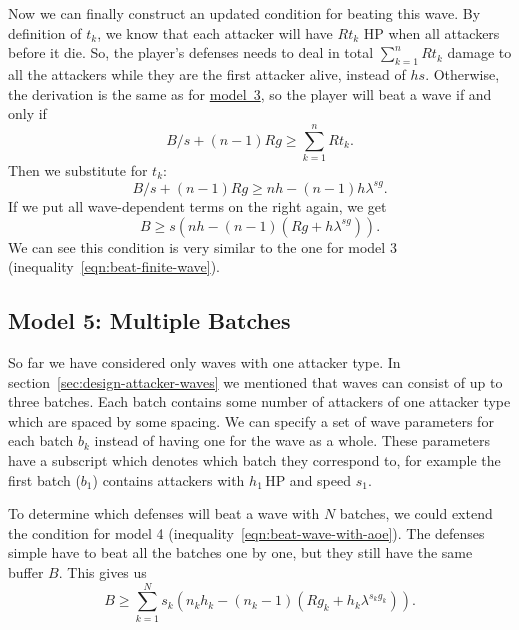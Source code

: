 Now we can finally construct an updated condition for beating this wave.
By definition of $t_k$, we know that each attacker will have $Rt_k$ HP when all attackers before it die.
So, the player's defenses needs to deal in total $\sum_{k=1}^{n} Rt_k$ damage to all the attackers while they are the first attacker alive, instead of $hs$.
Otherwise, the derivation is the same as for \hyperref[sec:analysis-waves-finite]{model~3}, so the player will beat a wave if and only if
\begin{equation*}
    B/s + (n-1)Rg \geq \sum_{k=1}^{n} Rt_k.
\end{equation*}
Then we substitute for $t_k$:
\begin{equation*}
    B/s + (n-1)Rg \geq nh - (n-1)h\lambda^{sg}.
\end{equation*}
If we put all wave-dependent terms on the right again, we get
\begin{equation}\label{eqn:beat-wave-with-aoe}
    B \geq s(nh - (n-1)(Rg + h\lambda^{sg})).
\end{equation}
We can see this condition is very similar to the one for model 3 (inequality~\ref{eqn:beat-finite-wave}).

\subsection{Model 5: Multiple Batches}
So far we have considered only waves with one attacker type.
In section~\ref{sec:design-attacker-waves} we mentioned that waves can consist of up to three batches.
Each batch contains some number of attackers of one attacker type which are spaced by some spacing.
We can specify a set of wave parameters for each batch $b_k$ instead of having one for the wave as a whole.
These parameters have a subscript which denotes which batch they correspond to, for example the first batch ($b_1$) contains attackers with $h_1$\,HP and speed $s_1$.

To determine which defenses will beat a wave with $N$ batches, we could extend the condition for model 4 (inequality~\ref{eqn:beat-wave-with-aoe}).
The defenses simple have to beat all the batches one by one, but they still have the same buffer $B$.
This gives us
\begin{equation*}
    B \geq \sum_{k=1}^{N} s_k (n_k h_k - (n_k - 1)(R g_k + h_k \lambda^{s_k g_k})).
\end{equation*}

